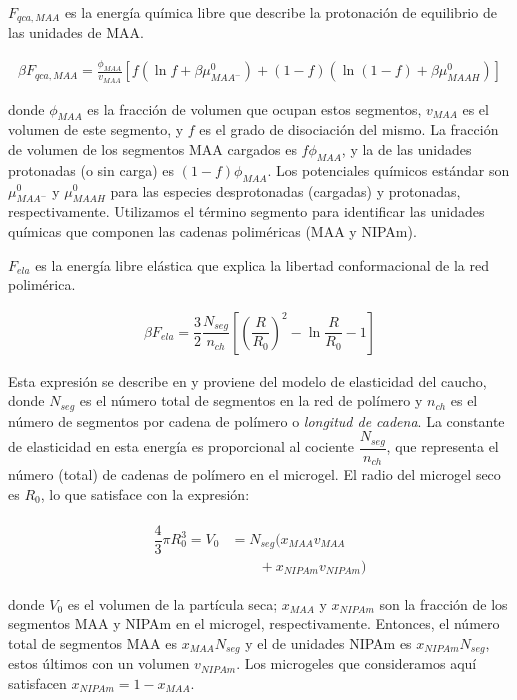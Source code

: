 $F_{qca,MAA}$ es la energ\'ia qu\'imica libre que describe la protonaci\'on de equilibrio de las unidades de MAA.


\begin{align}
	\beta F_{qca, MAA} =  \frac{\phi_{MAA}}{v_{MAA}} \left[f(\ln f+ \beta\mu^0_{MAA^-}) +(1-f)(\ln (1-f)+\beta\mu^0_{MAAH})\right]
\end{align}


\noindent donde $\phi_{MAA}$ es la fracci\'on de volumen que ocupan estos segmentos, $v_{MAA}$ es el volumen de este segmento, y $f$ es el grado de disociaci\'on del mismo. 
La fracci\'on de volumen de los segmentos MAA cargados es $f\phi_{MAA}$, y la de las unidades protonadas (o sin carga) es $(1-f)\phi_{MAA}$.
Los potenciales qu\'imicos est\'andar son $\mu^0_{MAA^-}$ y $\mu^0_{MAAH}$ para las especies desprotonadas (cargadas) y protonadas, respectivamente.
Utilizamos el t\'ermino segmento para identificar las unidades qu\'imicas que componen las cadenas polim\'ericas (MAA y NIPAm).


$F_{ela}$ es la energ\'ia libre el\'astica que explica la libertad conformacional de la red polim\'erica.

\begin{align}
	\beta F_{ela} = \dfrac{3}{2}\dfrac{N_{seg}}{n_{ch} }\left[\left(\dfrac{R}{R_0}\right)^2 - \ln\dfrac{R}{R_0} -1\right]
\end{align}

Esta expresi\'on se describe en \cite{moncho-jorda2016a} y proviene del modelo de elasticidad del caucho,
donde $N_{seg}$ es el n\'umero total de segmentos en la red de pol\'imero y $n_{ch}$ es el n\'umero de segmentos por cadena de pol\'imero o \emph{longitud de cadena}.
La constante de elasticidad en esta energ\'ia es proporcional al cociente $\dfrac{N_{seg}}{n_{ch}}$, que representa el n\'umero (total) de cadenas de pol\'imero en el microgel.
El radio del microgel seco es $R_0$, lo que satisface con la expresi\'on:

%
%
\begin{align}
	\begin{aligned} 
		\dfrac{4}{3}\pi R_0^3=V_0&=N_{seg}\Big( x_{MAA} v_{MAA}\\
		&\qquad+x_{NIPAm} v_{NIPAm}\Big)
	\end{aligned}
\end{align}


\noindent donde $V_0$ es el volumen de la part\'icula seca; $x_{MAA}$ y $x_{NIPAm}$ son la fracci\'on de los segmentos MAA y NIPAm en el microgel, respectivamente.
Entonces, el n\'umero total de segmentos MAA es $x_{MAA}N_{seg}$ y el de unidades NIPAm es $x_{NIPAm}N_{seg}$, estos \'ultimos con un volumen $v_{NIPAm}$.
Los microgeles que consideramos aqu\'i satisfacen $x_{NIPAm}=1-x_{MAA}$.



